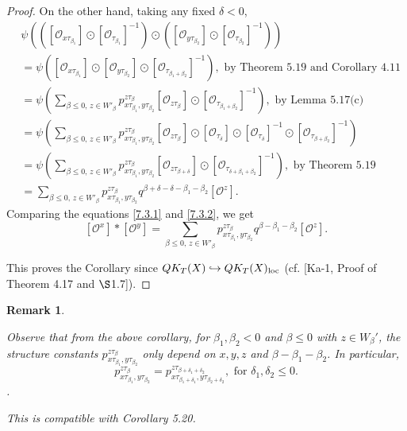 \documentclass{article}
\newtheorem{remark}[theorem]{Remark}
\def\ref#1{#1}
\def\loc{\rm{loc}}
\begin{document}
\begin{proof}
On the other hand, taking any fixed $\delta<0$, 
\begin{align}\label{7.3.2}
& \psi \left(( \left[ \mathcal{O}_{x\tau _{\beta_1}}\right] \odot  \left[ \mathcal{O}_{\tau _{\beta_1}}\right]^{-1}) \odot ( \left[ \mathcal{O}_{y\tau _{\beta_2}}\right] \odot  \left[ \mathcal{O}_{\tau_{\beta_2}}\right]^{-1}) \right) \nonumber\\
&= \psi \left( \left[ \mathcal{O}_{x\tau _{\beta_1}}\right] \odot  \left[ \mathcal{O}_{y\tau _{\beta_2}}\right] \odot\left[ \mathcal{O}_{\tau _{\beta_1+\beta_2}}\right]^{-1} \right),\mbox{ by Theorem \ref{5.19} and Corollary \ref{4.11}}\nonumber\\
&=  \psi ( \sum_{\beta\leq 0 ,\, z \in W'_\beta} p_{x\tau_{\beta_1},y \tau_{\beta_2}}^{z\tau_\beta} \left[ \mathcal{O}_{z\tau_\beta}\right] \odot 
\left[ \mathcal{O}_{\tau_{\beta_1+\beta_2}}\right]^{-1}),\mbox{ by Lemma \ref{5.17}(c)}\nonumber\\
&= \psi ( \sum_{\beta\leq 0, \,z\in W'_\beta} p_{x\tau_{\beta_1},y \tau_{\beta_2}}^{z\tau_\beta} \left[ \mathcal{O}_{z\tau_\beta}\right] \odot
\left[ \mathcal{O}_{\tau_\delta}\right] \odot \left[ \mathcal{O}_{\tau_\delta}\right] ^{-1}\odot  \left[ \mathcal{O}_{\tau_{\beta+\beta_2}}\right]^{-1})\nonumber\\
&= \psi( \sum_{\beta\leq 0 ,\, z \in W'_\beta} p_{x\tau_{\beta_1},y \tau_{\beta_2}}^{z\tau_\beta}\left[ \mathcal{O}_{z\tau_{\beta+\delta}}\right] \odot
\left[ \mathcal{O}_{\tau_{\delta+\beta_1+\beta_2}}\right]^{-1}),\mbox{ by Theorem \ref{5.19}}\nonumber\\
&= \sum_{\beta\leq 0 , \, z \in W'_\beta} p_{x\tau_{\beta_1},y \tau_{\beta_2}}^{z\tau_\beta} q^{\beta+\delta -\delta - \beta_1-\beta_2}\left[ \mathcal{O}^{z}\right].
\end{align}
Comparing the equations \eqref{7.3.1}  and \eqref{7.3.2}, we get 
$$ 
\left[ \mathcal{O}^x\right] *\left[ \mathcal{O}^y\right] = \sum_{\beta\leq 0 , \, z\in W'_\beta} p_{x\tau_{\beta_1},y \tau_{\beta_2}}^{z\tau_\beta} q^{\beta-\beta_1-\beta_2} \left[ \mathcal{O}^{z}\right].
$$

This proves the Corollary since $QK_T(X) \hookrightarrow QK_T(X)_{\loc}$
(cf. [Ka-1, Proof of Theorem 4.17 and $\S$1.7]).
\end{proof}

\begin{remark}\label{7.4} \rm{
Observe that from the above corollary,  for $\beta_1,\beta_2<0 $ and $\beta\leq 0$ with $z \in W_\beta'$, the structure constants $p_{x\tau_{\beta_1},y \tau_{\beta_2}}^{z\tau_\beta}$ only depend on $x,y, z$ and $\beta-\beta_1-\beta_2$. In particular, 
$$
p_{x\tau_{\beta_1},y \tau_{\beta_2}}^{z\tau_\beta} =p_{x\tau_{\beta_1+\delta_1},y \tau_{\beta_2+\delta_2}}^{z\tau_{\beta+\delta_1+\delta_2}}, \mbox{ for } \delta_1,\delta_2\leq 0.
 $$. 

This is compatible with Corollary \ref{5.20}. }
\end{remark}
\end{document}
